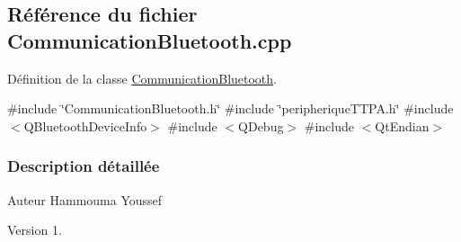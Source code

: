 \hypertarget{terminal-_t_t_p_a_2communicationbluetooth_8cpp}{}\subsection{Référence du fichier Communication\+Bluetooth.\+cpp}
\label{terminal-_t_t_p_a_2communicationbluetooth_8cpp}


Définition de la classe \hyperlink{class_communication_bluetooth}{Communication\+Bluetooth}.  


{\ttfamily \#include \char`\"{}Communication\+Bluetooth.\+h\char`\"{}}\newline
{\ttfamily \#include \char`\"{}peripherique\+T\+T\+P\+A.\+h\char`\"{}}\newline
{\ttfamily \#include $<$Q\+Bluetooth\+Device\+Info$>$}\newline
{\ttfamily \#include $<$Q\+Debug$>$}\newline
{\ttfamily \#include $<$Qt\+Endian$>$}\newline


\subsubsection{Description détaillée}
\begin{DoxyAuthor}{Auteur}
Hammouma Youssef
\end{DoxyAuthor}
\begin{DoxyVersion}{Version}
1. 
\end{DoxyVersion}
